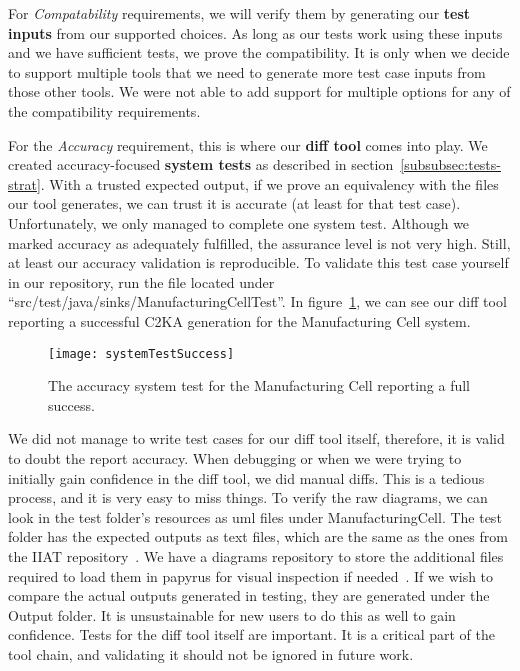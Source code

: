 For \textit{Compatability} requirements,
we will verify them by generating our \textbf{test inputs} from our supported choices.
As long as our tests work using these inputs and we have sufficient tests, we prove the compatibility.
It is only when we decide to support multiple tools that we need to generate more test case inputs from those other tools.
We were not able to add support for multiple options for any of the compatibility requirements.

For the \textit{Accuracy} requirement, this is where our \textbf{diff tool} comes into play.
We created accuracy-focused \textbf{system tests} as described in section~\ref{subsubsec:tests-strat}.
With a trusted expected output, if we prove an equivalency with the files our tool generates, we can trust it is accurate (at least for that test case).
Unfortunately, we only managed to complete one system test.
Although we marked accuracy as adequately fulfilled, the assurance level is not very high.
Still, at least our accuracy validation is reproducible.
To validate this test case yourself in our repository, run the file located under ``src/test/java/sinks/ManufacturingCellTest''.
In figure~\ref{fig:acc-test}, we can see our diff tool reporting a successful C2KA generation for the Manufacturing Cell system.

\begin{figure}
    \centering
    \texttt{[image: systemTestSuccess]}
    \caption{The accuracy system test for the Manufacturing Cell reporting a full success.}
    \label{fig:acc-test}
\end{figure}

We did not manage to write test cases for our diff tool itself, therefore, it is valid to doubt the report accuracy.
When debugging or when we were trying to initially gain confidence in the diff tool, we did manual diffs.
This is a tedious process, and it is very easy to miss things.
To verify the raw diagrams, we can look in the test folder's resources as uml files under ManufacturingCell.
The test folder has the expected outputs as text files, which are the same as the ones from the IIAT repository~\cite{repo_iiat}.
We have a diagrams repository to store the additional files required to load them in papyrus for visual inspection if needed~\cite{repo_diagram}.
If we wish to compare the actual outputs generated in testing, they are generated under the Output folder.
It is unsustainable for new users to do this as well to gain confidence.
Tests for the diff tool itself are important.
It is a critical part of the tool chain, and validating it should not be ignored in future work.

